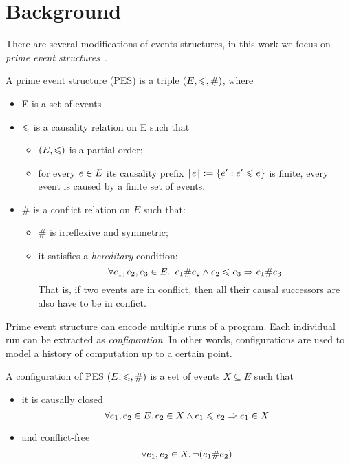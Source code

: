 \section{Background}

There are several modifications of events structures, 
in this work we focus on \emph{prime event structures}~\cite{Winskel:86}.

\begin{definition} 
\label{es_def}
A prime event structure (PES) is a triple $(E, \leqslant, \#)$, where
\begin{itemize}
  \item E is a set of events
  \item $\leqslant$ is a causality relation on E such that 
  \begin{itemize}
    \item $ (E, \leqslant) $ is a partial order;
    \item for every $e \in E$ its causality prefix ${\lceil e \rceil := \{ e' : e' \leqslant e \}}$ 
      is finite, \ie every event is caused by a finite set of events.
  \end{itemize}
  \item $\#$ is a conflict relation on $E$ such that:
  \begin{itemize}
    \item $\#$ is irreflexive and symmetric;
    \item it satisfies a \emph{hereditary} condition:
    $$ \forall e_1, e_2, e_3 \in E \ldotp \ e_1 \# e_2 \land e_2 \leqslant e_3 \Rightarrow e_1 \# e_3 $$
      That is, if two events are in conflict, then all their causal successors 
      are also have to be in confict. 
  \end{itemize}
\end{itemize}
\end{definition}

Prime event structure can encode multiple runs of a program.
Each individual run can be extracted as \emph{configuration}. 
In other words, configurations are used to model 
a history of computation up to a certain point.

\begin{definition}
A configuration of PES $(E, \leqslant, \#)$ is a set of events $X \subseteq E$ such that
\begin{itemize}
  \item it is causally closed 
    $$ \forall e_1, e_2 \in E \ldotp e_2 \in X \land e_1 \leqslant e_2 \Rightarrow e_1 \in X $$
  \item and conflict-free 
    $$ \forall e_1, e_2 \in X \ldotp \neg (e_1 \# e_2) $$
\end{itemize}
\end{definition}

